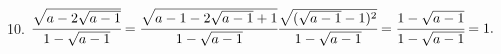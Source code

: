 10. $\cfrac{\sqrt{a-2\sqrt{a-1}}}{1-\sqrt{a-1}}=\cfrac{\sqrt{a-1-2\sqrt{a-1}+1}}{1-\sqrt{a-1}}\cfrac{\sqrt{(\sqrt{a-1}-1)^2}}{1-\sqrt{a-1}}=
\cfrac{1-\sqrt{a-1}}{1-\sqrt{a-1}}=1.$\\
